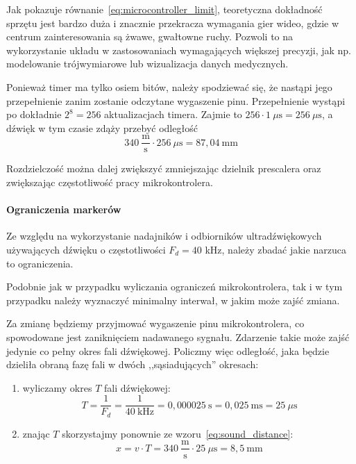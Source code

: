 Jak pokazuje równanie~\ref{eq:microcontroller_limit}, teoretyczna dokładność sprzętu jest bardzo duża i znacznie przekracza wymagania gier wideo, gdzie w centrum zainteresowania są żwawe, gwałtowne ruchy. Pozwoli to na wykorzystanie układu w zastosowaniach wymagających większej precyzji, jak np. modelowanie trójwymiarowe lub wizualizacja danych medycznych.

Ponieważ timer ma tylko osiem bitów, należy spodziewać się, że nastąpi jego przepełnienie zanim zostanie odczytane wygaszenie pinu. Przepełnienie wystąpi po dokładnie $2^8 = 256$ aktualizacjach timera. Zajmie to $256 \cdot 1~\mu\textrm{s} = 256~\mu\textrm{s}$, a dźwięk w tym czasie zdąży przebyć odległość 
\begin{equation}
 340~\frac{\textrm{m}}{\textrm{s}} \cdot 256~\mu\textrm{s} = 87,04~\textrm{mm}
\end{equation}

Rozdzielczość można dalej zwiększyć zmniejszając dzielnik prescalera  oraz zwiększając częstotliwość pracy mikrokontrolera.

\paragraph{Ograniczenia markerów}
\label{section:sound_limit}

Ze względu na wykorzystanie nadajników i odbiorników ultradźwiękowych używających dźwięku o częstotliwości $F_{d} = 40$ kHz, należy zbadać jakie narzuca to ograniczenia.

Podobnie jak w przypadku wyliczania ograniczeń mikrokontrolera, tak i w tym przypadku należy wyznaczyć minimalny interwał, w jakim może zajść zmiana.

Za zmianę będziemy przyjmować wygaszenie pinu mikrokontrolera, co spowodowane jest zaniknięciem nadawanego sygnału. Zdarzenie takie może zajść jedynie co pełny okres fali dźwiękowej. Policzmy więc odległość, jaka będzie dzieliła obraną fazę fali w dwóch ,,sąsiadujących'' okresach:

\begin{enumerate}
 \item wyliczamy okres $T$ fali dźwiękowej:
    \begin{equation}
      T = \frac{1}{F_d} = \frac{1}{40~\textrm{kHz}} = 0,000025~\textrm{s} = 0,025~\textrm{ms} = 25~\mu\textrm{s}
    \end{equation}
 \item znając $T$ skorzystajmy ponownie ze wzoru~\ref{eq:sound_distance}:
    \begin{equation}
      x = v \cdot T = 340~\frac{\textrm{m}}{\textrm{s}} \cdot 25~\mu\textrm{s} = 8,5~\textrm{mm}
      \label{eq:sound_limit}
    \end{equation}
\end{enumerate}


